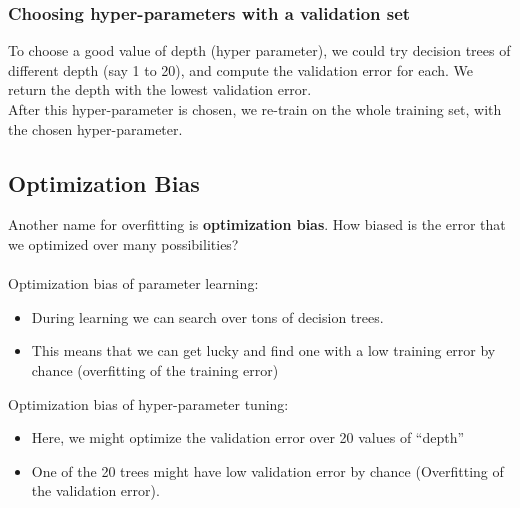 \documentclass{article}
\theoremstyle{definition}
\begin{document}
\subsubsection*{Choosing hyper-parameters with a validation set}
To choose a good value of depth (hyper parameter), we could try decision trees of different depth (say 1 to 20), and compute the validation error for each. We return the depth with the lowest validation error. \\
After this hyper-parameter is chosen, we re-train on the whole training set, with the chosen hyper-parameter. 
\subsection*{Optimization Bias}
Another name for overfitting is \textbf{optimization bias}. How biased is the error that we optimized over many possibilities? \\\\
Optimization bias of parameter learning:
\begin{itemize}
	\item During learning we can search over tons of decision trees. 
	\item This means that we can get lucky and find one with a low training error by chance (overfitting of the training error)
\end{itemize}
Optimization bias of hyper-parameter tuning:
\begin{itemize}
	\item Here, we might optimize the validation error over 20 values of “depth”
	\item One of the 20 trees might have low validation error by chance (Overfitting of the validation error).
\end{itemize}
\end{document}
